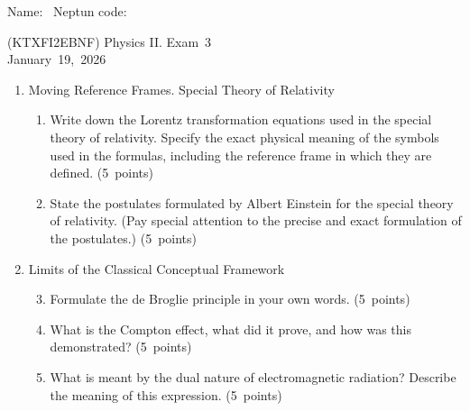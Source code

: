 \documentclass[a4paper,12pt]{letter}
\begin{document}
Name: \hrulefill\ Neptun code: \hrulefill

\bigskip

\begin{center}
(KTXFI2EBNF) Physics II. Exam~3 \\
January~19,~2026
\end{center}

\bigskip
 
\begin{enumerate}[label=\Roman*.]
   
\item Moving Reference Frames. Special Theory of Relativity

\begin{enumerate}[label=\arabic*.]
\setcounter{enumii}{0} %

\item  Write down the Lorentz transformation equations used in the special theory of relativity. Specify the exact physical meaning of the symbols used in the formulas, including the reference frame in which they are defined. \hfill (5~points)

\item State the postulates formulated by Albert Einstein for the special theory of relativity. (Pay special attention to the precise and exact formulation of the postulates.) \hfill (5~points)

\end{enumerate}


\item Limits of the Classical Conceptual Framework

\begin{enumerate}[label=\arabic*.]
\setcounter{enumii}{2} %

\item Formulate the de Broglie principle in your own words. \hfill (5~points)
  
\item What is the Compton effect, what did it prove, and how was this demonstrated? \hfill (5~points)

\item What is meant by the dual nature of electromagnetic radiation? Describe the meaning of this expression. \hfill (5~points)

\end{enumerate}
  

\end{enumerate}
\end{document}
